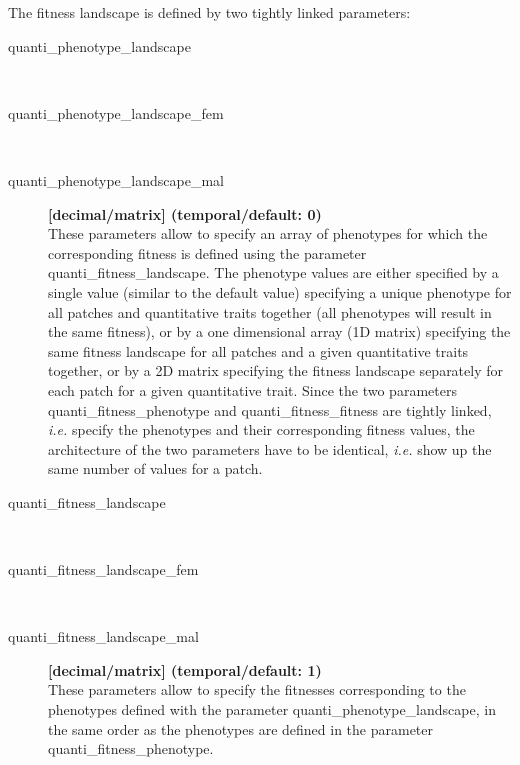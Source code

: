 \documentclass[letterpaper,12pt,oneside]{book}
\begin{document}
The fitness landscape is defined by two tightly linked parameters:

\begin{description}
\item[quanti\_phenotype\_landscape]\hspace*{\fill}\\
\vspace{-9mm}
\item[quanti\_phenotype\_landscape\_fem]\hspace*{\fill}\\
\vspace{-9mm}
\item[quanti\_phenotype\_landscape\_mal]\textbf{[decimal/matrix] (temporal/default: 0)}\\
These parameters allow to specify an array of phenotypes for which the corresponding fitness is defined using the parameter \textsf{quanti\_fitness\_landscape}.  The phenotype values are either specified by a single value (similar to the default value) specifying a unique phenotype for all patches and quantitative traits together (all phenotypes will result in the same fitness), or by a one dimensional array (1D matrix) specifying the same fitness landscape for all patches and a given quantitative traits together, or by a 2D matrix specifying the fitness landscape separately for each patch for a given quantitative trait. Since the two parameters \textsf{quanti\_fitness\_phenotype} and \textsf{quanti\_fitness\_fitness} are tightly linked, \textit{i.e.} specify the phenotypes and their corresponding fitness values, the architecture of the two parameters have to be identical, \textit{i.e.} show up the same number of values for a patch. 


\item[quanti\_fitness\_landscape]\hspace*{\fill}\\
\vspace{-9mm}
\item[quanti\_fitness\_landscape\_fem]\hspace*{\fill}\\
\vspace{-9mm}
\item[quanti\_fitness\_landscape\_mal]\textbf{[decimal/matrix] (temporal/default: 1)}\\
These parameters allow to specify the fitnesses corresponding to the phenotypes defined with the parameter \textsf{quanti\_phenotype\_landscape}, in the same order as the phenotypes are defined in the parameter \textsf{quanti\_fitness\_phenotype}. 
\end{description}
\end{document}
